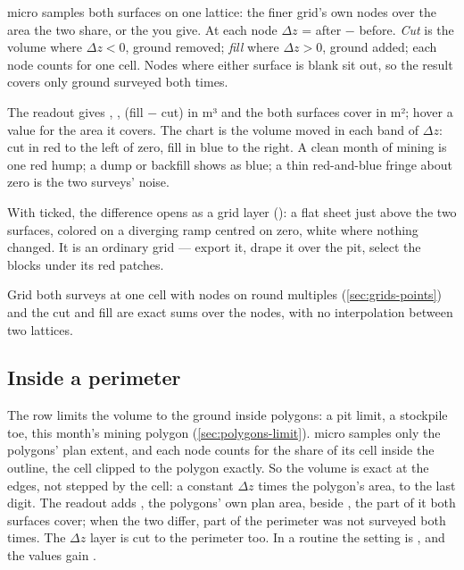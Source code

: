 micro samples both surfaces on one lattice: the finer grid's own nodes over the area the two share, or the  you give. At each node $\Delta z$ = after − before. \emph{Cut} is the volume where $\Delta z < 0$, ground removed; \emph{fill} where $\Delta z > 0$, ground added; each node counts for one cell. Nodes where either surface is blank sit out, so the result covers only ground surveyed both times.

The readout gives , ,  (fill − cut) in m³ and the  both surfaces cover in m²; hover a value for the area it covers. The chart is the volume moved in each band of $\Delta z$: cut in red to the left of zero, fill in blue to the right. A clean month of mining is one red hump; a dump or backfill shows as blue; a thin red-and-blue fringe about zero is the two surveys' noise.

With  ticked, the difference opens as a grid layer (): a flat sheet just above the two surfaces, colored on a diverging ramp centred on zero, white where nothing changed. It is an ordinary grid — export it, drape it over the pit, select the blocks under its red patches.

\begin{tip}
Grid both surveys at one cell with nodes on round multiples (\cref{sec:grids-points}) and the cut and fill are exact sums over the nodes, with no interpolation between two lattices.
\end{tip}

\subsection{Inside a perimeter}
The  row limits the volume to the ground inside polygons: a pit limit, a stockpile toe, this month's mining polygon (\cref{sec:polygons-limit}). micro samples only the polygons' plan extent, and each node counts for the share of its cell inside the outline, the cell clipped to the polygon exactly. So the volume is exact at the edges, not stepped by the cell: a constant $\Delta z$ times the polygon's area, to the last digit. The readout adds , the polygons' own plan area, beside , the part of it both surfaces cover; when the two differ, part of the perimeter was not surveyed both times. The $\Delta z$ layer is cut to the perimeter too. In a routine the setting is , and the values gain .

